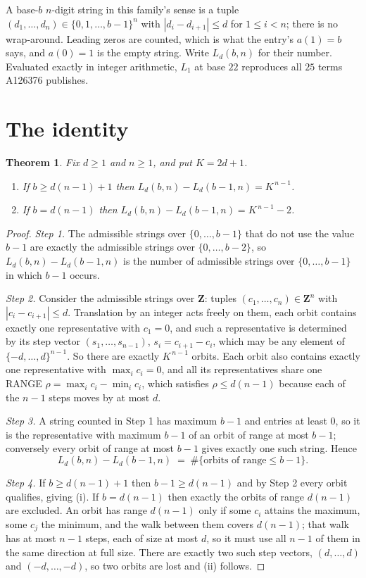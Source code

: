 \documentclass[11pt,a4paper]{article}
\theoremstyle{plain}
\newtheorem{theorem}{Theorem}
\theoremstyle{definition}
\begin{document}
A base-$b$ $n$-digit string in this family's sense is a tuple
$(d_1,\dots,d_n)\in\{0,1,\dots,b-1\}^{n}$ with $|d_i-d_{i+1}|\le d$ for $1\le i<n$; there
is no wrap-around. Leading zeros are counted, which is what the entry's $a(1)=b$ says, and
$a(0)=1$ is the empty string. Write $L_d(b,n)$ for their number. Evaluated exactly in integer
arithmetic, $L_{1}$ at base $22$ reproduces all $25$ terms A126376 publishes.

\section{The identity}

\begin{theorem}
Fix $d\ge1$ and $n\ge1$, and put $K=2d+1$.
\begin{enumerate}
\item[(i)] If $b\ge d(n-1)+1$ then $L_d(b,n)-L_d(b-1,n)=K^{\,n-1}$.
\item[(ii)] If $b=d(n-1)$ then $L_d(b,n)-L_d(b-1,n)=K^{\,n-1}-2$.
\end{enumerate}
\end{theorem}

\begin{proof}
\emph{Step 1.} The admissible strings over $\{0,\dots,b-1\}$ that do not use the value $b-1$
are exactly the admissible strings over $\{0,\dots,b-2\}$, so $L_d(b,n)-L_d(b-1,n)$ is the
number of admissible strings over $\{0,\dots,b-1\}$ in which $b-1$ occurs.

\emph{Step 2.} Consider the admissible strings over $\mathbf{Z}$: tuples
$(c_1,\dots,c_n)\in\mathbf{Z}^{n}$ with $|c_i-c_{i+1}|\le d$. Translation by an integer acts
freely on them, each orbit contains exactly one representative with $c_1=0$, and such a
representative is determined by its step vector $(s_1,\dots,s_{n-1})$, $s_i=c_{i+1}-c_i$,
which may be any element of $\{-d,\dots,d\}^{n-1}$. So there are exactly $K^{\,n-1}$ orbits.
Each orbit also contains exactly one representative with $\max_i c_i=0$, and all its
representatives share one RANGE $\rho=\max_ic_i-\min_ic_i$, which satisfies
$\rho\le d(n-1)$ because each of the $n-1$ steps moves by at most $d$.

\emph{Step 3.} A string counted in Step 1 has maximum $b-1$ and entries at least $0$, so it is
the representative with maximum $b-1$ of an orbit of range at most $b-1$; conversely every orbit
of range at most $b-1$ gives exactly one such string. Hence
\[
L_d(b,n)-L_d(b-1,n)\;=\;\#\{\text{orbits of range}\le b-1\} .
\]

\emph{Step 4.} If $b\ge d(n-1)+1$ then $b-1\ge d(n-1)$ and by Step 2 every orbit qualifies,
giving (i). If $b=d(n-1)$ then exactly the orbits of range $d(n-1)$ are excluded. An orbit has
range $d(n-1)$ only if some $c_i$ attains the maximum, some $c_j$ the minimum, and the walk
between them covers $d(n-1)$; that walk has at most $n-1$ steps, each of size at most $d$, so it
must use all $n-1$ of them in the same direction at full size. There are exactly two such step
vectors, $(d,\dots,d)$ and $(-d,\dots,-d)$, so two orbits are lost and (ii) follows.
\end{proof}
\end{document}
